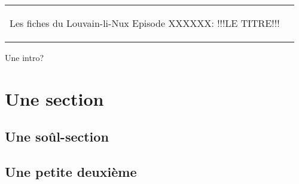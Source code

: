 



\begin{tabular}{p{13cm}r}
	\begin{center}{\Large Les fiches du Louvain-li-Nux\linebreak \linebreak
	\LARGE Episode XXXXXX: !!!LE TITRE!!!}\end{center}
		&
	\usebox{\logollnux}
\end{tabular}

Une intro?

\section*{Une section}

\subsection*{Une soûl-section}

\subsection*{Une petite deuxième}
                                                                                                                   


